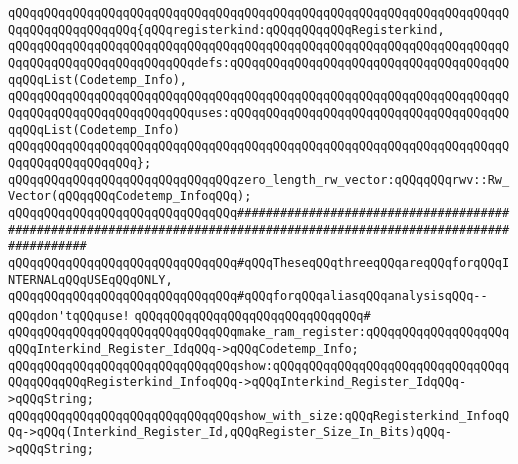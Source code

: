 \verb|qQQqqQQqqQQqqQQqqQQqqQQqqQQqqQQqqQQqqQQqqQQqqQQqqQQqqQQqqQQqqQQqqQQqqQQqqQQqqQQqqQQqqQQq{qQQqregisterkind:qQQqqQQqqQQqRegisterkind,|\newline
\verb|qQQqqQQqqQQqqQQqqQQqqQQqqQQqqQQqqQQqqQQqqQQqqQQqqQQqqQQqqQQqqQQqqQQqqQQqqQQqqQQqqQQqqQQqqQQqqQQqdefs:qQQqqQQqqQQqqQQqqQQqqQQqqQQqqQQqqQQqqQQqqQQqList(Codetemp_Info),|\newline
\verb|qQQqqQQqqQQqqQQqqQQqqQQqqQQqqQQqqQQqqQQqqQQqqQQqqQQqqQQqqQQqqQQqqQQqqQQqqQQqqQQqqQQqqQQqqQQqqQQquses:qQQqqQQqqQQqqQQqqQQqqQQqqQQqqQQqqQQqqQQqqQQqList(Codetemp_Info)|\newline
\verb|qQQqqQQqqQQqqQQqqQQqqQQqqQQqqQQqqQQqqQQqqQQqqQQqqQQqqQQqqQQqqQQqqQQqqQQqqQQqqQQqqQQqqQQq};|\newline
\newline
\newline
\verb|qQQqqQQqqQQqqQQqqQQqqQQqqQQqqQQqzero_length_rw_vector:qQQqqQQqrwv::Rw_Vector(qQQqqQQqCodetemp_InfoqQQq);|\newline
\newline
\newline
\newline
\newline
\newline
\newline
\verb|qQQqqQQqqQQqqQQqqQQqqQQqqQQqqQQq#######################################################################################################################|\newline
\verb|qQQqqQQqqQQqqQQqqQQqqQQqqQQqqQQq#qQQqTheseqQQqthreeqQQqareqQQqforqQQqINTERNALqQQqUSEqQQqONLY,|\newline
\verb|qQQqqQQqqQQqqQQqqQQqqQQqqQQqqQQq#qQQqforqQQqaliasqQQqanalysisqQQq--qQQqdon'tqQQquse!|\newline
\verb|qQQqqQQqqQQqqQQqqQQqqQQqqQQqqQQq#|\newline
\verb|qQQqqQQqqQQqqQQqqQQqqQQqqQQqqQQqmake_ram_register:qQQqqQQqqQQqqQQqqQQqqQQqInterkind_Register_IdqQQq->qQQqCodetemp_Info;|\newline
\verb|qQQqqQQqqQQqqQQqqQQqqQQqqQQqqQQqshow:qQQqqQQqqQQqqQQqqQQqqQQqqQQqqQQqqQQqqQQqqQQqRegisterkind_InfoqQQq->qQQqInterkind_Register_IdqQQq->qQQqString;|\newline
\verb|qQQqqQQqqQQqqQQqqQQqqQQqqQQqqQQqshow_with_size:qQQqRegisterkind_InfoqQQq->qQQq(Interkind_Register_Id,qQQqRegister_Size_In_Bits)qQQq->qQQqString;|\newline
\newline
\newline
\newline
